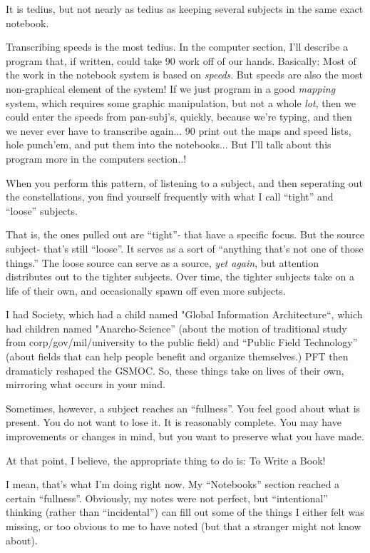 \documentclass[oneside]{book}
\begin{document}
It is tedius, but not nearly as tedius as keeping several subjects in
the same exact notebook.

Transcribing speeds is the most tedius. In the computer section, I'll
describe a program that, if written, could take 90%
work off of our hands. Basically: Most of the work in the notebook
system is based on \emph{speeds}. But speeds are also the most
non-graphical element of the system! If we just program in a good
\emph{mapping} system, which requires some graphic manipulation, but not a
whole \emph{lot}, then we could enter the speeds from pan-subj's, quickly,
because we're typing, and then we never ever have to transcribe
again... 90%
print out the maps and speed lists, hole punch'em, and put them into
the notebooks... But I'll talk about this program more in the
computers section..!

When you perform this pattern, of listening to a subject, and then
seperating out the constellations, you find yourself frequently with
what I call ``tight'' and ``loose'' subjects.

That is, the ones pulled out are ``tight''- that have a specific
focus. But the source subject- that's still ``loose''. It serves as a
sort of ``anything that's not one of those things.'' The loose source
can serve as a source, \emph{yet again}, but attention distributes out to
the tighter subjects. Over time, the tighter subjects take on a life
of their own, and occasionally spawn off even more subjects.

I had Society, which had a child named "Global Information
Architecture``, which had children named "Anarcho-Science'' (about the
motion of traditional study from corp/gov/mil/university to the public
field) and ``Public Field Technology'' (about fields that can help
people benefit and organize themselves.) PFT then dramaticly reshaped
the GSMOC. So, these things take on lives of their own, mirroring what
occurs in your mind.

Sometimes, however, a subject reaches an ``fullness''. You feel good
about what is present. You do not want to lose it. It is reasonably
complete. You may have improvements or changes in mind, but you want
to preserve what you have made.

At that point, I believe, the appropriate thing to do is: To Write a
Book!

I mean, that's what I'm doing right now. My ``Notebooks'' section
reached a certain ``fullness''. Obviously, my notes were not perfect,
but ``intentional'' thinking (rather than ``incidental'') can fill out
some of the things I either felt was missing, or too obvious to me to
have noted (but that a stranger might not know about).
\end{document}

